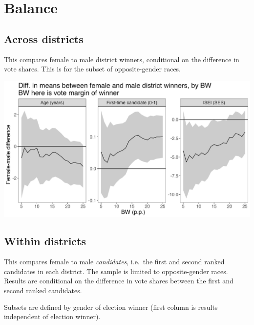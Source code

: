\documentclass[
  letterpaper,
  DIV=11,
  numbers=noendperiod]{scrartcl}
\begin{document}
\hypertarget{balance}{%
\section{Balance}\label{balance}}

\hypertarget{across-districts}{%
\subsection{Across districts}\label{across-districts}}

This compares female to male district winners, conditional on the
difference in vote shares. This is for the subset of opposite-gender
races.

\includegraphics{images/Balance_AcrossDist.png}

\hypertarget{within-districts}{%
\subsection{Within districts}\label{within-districts}}

This compares female to male \emph{candidates}, i.e.~the first and
second ranked candidates in each district. The sample is limited to
opposite-gender races. Results are conditional on the difference in vote
shares between the first and second ranked candidates.

Subsets are defined by gender of election winner (first column is
results independent of election winner).
\end{document}
